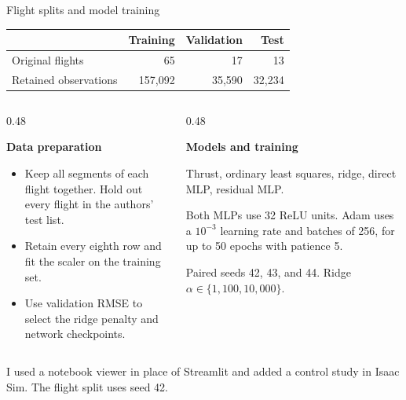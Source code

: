 \documentclass[11pt,aspectratio=169]{beamer}
\newcommand{\source}[1]{\par\vfill{\color{Muted}\fontsize{7}{8.5}\selectfont #1\par}}
\newcommand{\topic}[1]{\par{\color{Teal}\bfseries #1}\par\vspace{0.12cm}}
\newcommand{\tightlist}{\setlength{\itemsep}{0.17cm}\setlength{\parskip}{0pt}}
\begin{document}
\begin{frame}[t]{Flight splits and model training}
\par\vspace{-0.08cm}
\begin{center}
\begin{tabular}{lrrr}
\toprule
 & Training & Validation & Test \\
\midrule
Original flights & 65 & 17 & 13 \\
Retained observations & 157,092 & 35,590 & 32,234 \\
\bottomrule
\end{tabular}\par
\end{center}
\par\vspace{0.06cm}
\begin{columns}[T,onlytextwidth]
\begin{column}{0.48\textwidth}
\topic{Data preparation}
\begin{itemize}\tightlist
\item Keep all segments of each flight together. Hold out every flight in the authors' test list.
\item Retain every eighth row and fit the scaler on the training set.
\item Use validation RMSE to select the ridge penalty and network checkpoints.
\end{itemize}
\end{column}
\begin{column}{0.48\textwidth}
\topic{Models and training}
Thrust, ordinary least squares, ridge, direct MLP, residual MLP.
\par\vspace{0.18cm}
Both MLPs use 32 ReLU units. Adam uses a $10^{-3}$ learning rate and batches of 256, for up to 50 epochs with patience 5.
\par\vspace{0.18cm}
Paired seeds 42, 43, and 44. Ridge $\alpha\in\{1,100,10{,}000\}$.
\end{column}
\end{columns}
\source{I used a notebook viewer in place of Streamlit and added a control study in Isaac Sim. The flight split uses seed 42.}
\end{frame}
\end{document}
